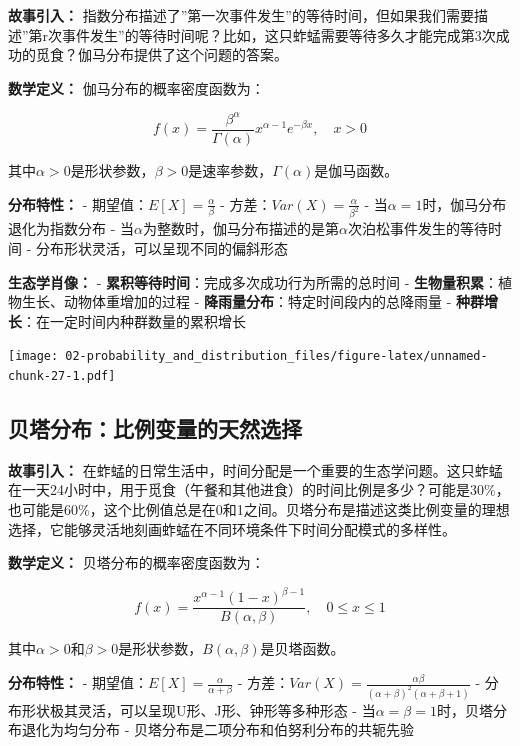 \documentclass[
  twoside]{book}
\begin{document}
\textbf{故事引入：} 指数分布描述了''第一次事件发生''的等待时间，但如果我们需要描述''第r次事件发生''的等待时间呢？比如，这只蚱蜢需要等待多久才能完成第3次成功的觅食？伽马分布提供了这个问题的答案。

\textbf{数学定义：} 伽马分布的概率密度函数为：

\[f(x) = \frac{\beta^\alpha}{\Gamma(\alpha)} x^{\alpha-1} e^{-\beta x}, \quad x > 0\]

其中\(\alpha > 0\)是形状参数，\(\beta > 0\)是速率参数，\(\Gamma(\alpha)\)是伽马函数。

\textbf{分布特性：}
- 期望值：\(E[X] = \frac{\alpha}{\beta}\)
- 方差：\(Var(X) = \frac{\alpha}{\beta^2}\)
- 当\(\alpha = 1\)时，伽马分布退化为指数分布
- 当\(\alpha\)为整数时，伽马分布描述的是第\(\alpha\)次泊松事件发生的等待时间
- 分布形状灵活，可以呈现不同的偏斜形态

\textbf{生态学肖像：}
- \textbf{累积等待时间}：完成多次成功行为所需的总时间
- \textbf{生物量积累}：植物生长、动物体重增加的过程
- \textbf{降雨量分布}：特定时间段内的总降雨量
- \textbf{种群增长}：在一定时间内种群数量的累积增长

\texttt{[image: 02-probability\_and\_distribution\_files/figure-latex/unnamed-chunk-27-1.pdf]}

\hypertarget{ux8d1dux5854ux5206ux5e03ux6bd4ux4f8bux53d8ux91cfux7684ux5929ux7136ux9009ux62e9}{%
\subsection{贝塔分布：比例变量的天然选择}\label{ux8d1dux5854ux5206ux5e03ux6bd4ux4f8bux53d8ux91cfux7684ux5929ux7136ux9009ux62e9}}

\textbf{故事引入：} 在蚱蜢的日常生活中，时间分配是一个重要的生态学问题。这只蚱蜢在一天24小时中，用于觅食（午餐和其他进食）的时间比例是多少？可能是30\%，也可能是60\%，这个比例值总是在0和1之间。贝塔分布是描述这类比例变量的理想选择，它能够灵活地刻画蚱蜢在不同环境条件下时间分配模式的多样性。

\textbf{数学定义：} 贝塔分布的概率密度函数为：

\[f(x) = \frac{x^{\alpha-1}(1-x)^{\beta-1}}{B(\alpha, \beta)}, \quad 0 \leq x \leq 1\]

其中\(\alpha > 0\)和\(\beta > 0\)是形状参数，\(B(\alpha, \beta)\)是贝塔函数。

\textbf{分布特性：}
- 期望值：\(E[X] = \frac{\alpha}{\alpha + \beta}\)
- 方差：\(Var(X) = \frac{\alpha\beta}{(\alpha+\beta)^2(\alpha+\beta+1)}\)
- 分布形状极其灵活，可以呈现U形、J形、钟形等多种形态
- 当\(\alpha = \beta = 1\)时，贝塔分布退化为均匀分布
- 贝塔分布是二项分布和伯努利分布的共轭先验
\end{document}
